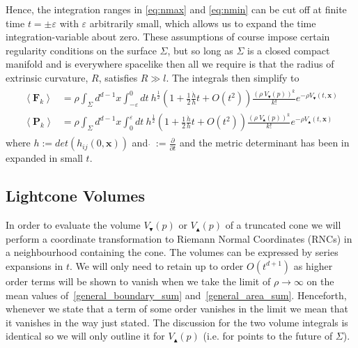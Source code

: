 \documentclass[12pt]{article}
\newcommand{\BF}[1]{\mathbf{F}_{#1}}
\newcommand{\BP}[1]{\mathbf{P}_{#1}}
\begin{document}
Hence, the integration ranges in \eqref{eq:nmax} and \eqref{eq:nmin} can be cut off at finite time $t=\pm\varepsilon$ with $\varepsilon$ arbitrarily small, which allows us to expand the time integration-variable about zero. These assumptions of course impose certain regularity conditions on the surface $\Sigma$, but so long as $\Sigma$ is a closed compact manifold and is everywhere spacelike then all we require is that the radius of extrinsic curvature, $R$, satisfies $R\gg l$. The integrals then simplify to
\begin{gather}\label{eq:nmax_and_eq:nmin}
\begin{aligned}
\left\langle \BF{k}\right\rangle & =\rho \int_{\Sigma}d^{d-1}x\int_{-\varepsilon}^{0}dt\:
h^{\frac{1}{2}}\left (1+
\frac{1}{2}\frac{\dot{h}}{h}t+O (t^2)\right)
 \frac{\left (\rho\: V_\blacktriangledown (p)\right)^k}{k!} e^{-\rho V_\blacktriangledown (t,\mathbf x)}
\\
\left\langle \BP{k}\right\rangle & =\rho \int_{\Sigma}d^{d-1}x\int_{0}^{\varepsilon}dt\:
h^{\frac{1}{2}}\left (1+
\frac{1}{2}\frac{\dot{h}}{h}t+O (t^2)\right) \frac{\left (\rho\: V_\blacktriangle (p)\right)^k}{k!} e^{-\rho V_\blacktriangle (t,\mathbf x)}
\end{aligned}
\end{gather}
where $h:= det\left (h_{ij} (0,\mathbf{x})\right)$ and $\dot{}\: := \frac{\partial}{\partial t}$ and the metric determinant has been in expanded in small $t$.

\subsection{Lightcone Volumes}

In order to evaluate the volume $V_\blacktriangledown (p)$ or $V_\blacktriangle (p)$ of a truncated cone we will perform a coordinate transformation to Riemann Normal Coordinates (RNCs) in a neighbourhood containing the cone. The volumes can be expressed by series expansions in $t$. We will only need to retain up to order $O(t^{d+1})$ as higher order terms will be shown to vanish when we take the limit of $\rho\rightarrow\infty$ on the mean values of~\eqref{general_boundary_sum} and~\eqref{general_area_sum}. Henceforth, whenever we state that a term of some order vanishes in the limit we mean that it vanishes in the way just stated. The discussion for the two volume integrals is identical so we will only outline it for $V_\blacktriangle (p)$ (i.e. for points to the future of $\Sigma$).
\end{document}
